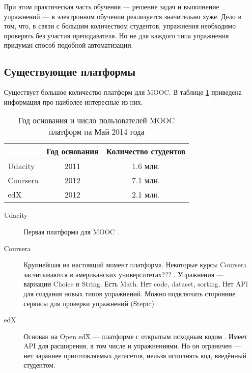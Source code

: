 \documentclass{matmex-diploma-custom}
\begin{document}
При этом практическая часть обучения --- решение задач и выполнение
упражнений --- в электронном обучении реализуется значительно хуже.
Дело в том, что, в связи с большим количеством студентов, упражнения
необходимо проверять без участия преподавателя. Но не для каждого типа
упражнения придуман способ подобной автоматизации.

\subsection*{Существующие платформы}

Существует большое количество платформ для MOOC. В таблице
\ref{table:platforms} приведена информация про наиболее интересные из
них.

\begin{table}[t]
  \centering
\begin{tabular}{|l|c|c|}
\hline
 & Год основания & Количество студентов \\
\hline
Udacity & 2011 & 1.6 млн. \\
Coursera & 2012 & 7.1 млн. \\
edX & 2012 & 2.1 млн. \\
\hline
\end{tabular}
  \caption{Год основания и число пользователей MOOC платформ на Май
    2014 года}
   \label{table:platforms}
\end{table}

\iffalse
#+ORGTBL: SEND plat orgtbl-to-latex :splice nil :skip 0
|----------+---------------+----------------------------------|
|          | Год основания | Количество студентов             |
|----------+---------------+----------------------------------|
| Udacity  |          2011 | 1.6 млн.                         |
| Coursera |          2012 | 7.1 млн.                         |
| edX      |          2012 | 2.1 млн.                         |
|----------+---------------+----------------------------------|
\fi

\begin{description}
\item[Udacity] Первая платформа для MOOC \cite{udacity}.
\item[Coursera] Крупнейшая на настоящий момент
  платформа. Некоторые курсы Coursera засчитываются в американских
  университетах??? \cite{coursera}. Упражнения --- вариации Choice и
  String. Есть Math. Нет code, dataset, sorting. Нет API для создания
  новых типов упражнений. Можно подключать сторонние сервисы для
  проверки упражнений (Stepic)
\item[edX] Основан на Open edX --- платформе с открытым исходным кодом
  \cite{edx}. Имеет API для расширения, в том числе и упражнениями.
  Но он ограничен --- нет зараниее приготовляемых датасетов, нельзя
  исполнять код, введённый студентом.
\end{description}
\end{document}
